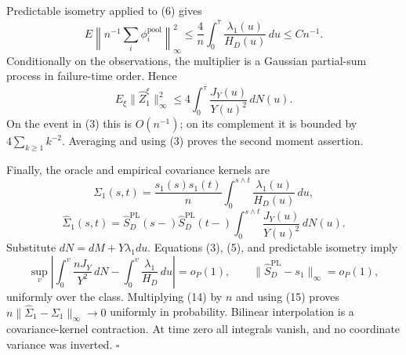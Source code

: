 Predictable isometry applied to (6) gives
\[
 E\left\|n^{-1}\sum_i\phi_i^{\mathrm{pool}}\right\|_\infty^2
 \le \frac4n\int_0^{\bar\tau}\frac{\lambda_1(u)}{H_D(u)}\,du
 \le Cn^{-1}.                                             \tag{12}
\]
Conditionally on the observations, the multiplier is a Gaussian partial-sum process in failure-time order. Hence
\[
 E_\xi\|\widehat Z_1^\xi\|_\infty^2
 \le4\int_0^{\bar\tau}\frac{J_Y(u)}{Y(u)^2}\,dN(u).     \tag{13}
\]
On the event in (3) this is \(O(n^{-1})\); on its complement it is bounded by \(4\sum_{k\ge1}k^{-2}\). Averaging and using (3) proves the second moment assertion.

Finally, the oracle and empirical covariance kernels are
\[
 \Sigma_1(s,t)=\frac{s_1(s)s_1(t)}n
 \int_0^{s\wedge t}\frac{\lambda_1(u)}{H_D(u)}\,du,
\]
\[
 \widehat\Sigma_1(s,t)=\widehat S_D^{\mathrm{PL}}(s-)
 \widehat S_D^{\mathrm{PL}}(t-)
 \int_0^{s\wedge t}\frac{J_Y(u)}{Y(u)^2}\,dN(u).         \tag{14}
\]
Substitute \(dN=dM+Y\lambda_1du\). Equations (3), (5), and predictable isometry imply
\[
 \sup_v\left|\int_0^v\frac{nJ_Y}{Y^2}\,dN
 -\int_0^v\frac{\lambda_1}{H_D}\,du\right|=o_P(1),
 \qquad \|\widehat S_D^{\mathrm{PL}}-s_1\|_\infty=o_P(1), \tag{15}
\]
uniformly over the class. Multiplying (14) by \(n\) and using (15) proves
\(n\|\widehat\Sigma_1-\Sigma_1\|_\infty\to0\) uniformly in probability. Bilinear interpolation is a covariance-kernel contraction. At time zero all integrals vanish, and no coordinate variance was inverted. \(\square\)